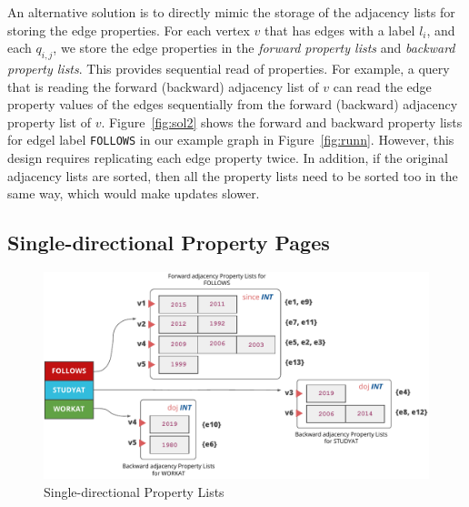  An alternative solution is to directly mimic the storage of the adjacency lists for storing the edge properties. For each vertex $v$ that has edges with a label $l_i$, and each $q_{i,j}$, we store the edge properties in the \emph{forward property lists} and \emph{backward property lists}. This provides sequential read of properties. For example, a query that is reading the forward (backward) adjacency list of $v$ can read the edge property values of the edges sequentially from the forward (backward) adjacency property list of $v$. Figure~\ref{fig:sol2} shows the forward and backward property lists for edgel label \texttt{FOLLOWS} in our example graph in Figure~\ref{fig:runn}. However, this design requires replicating each edge property twice. In addition, if the original adjacency lists are sorted, then all the property lists need to be sorted too in the same way, which would make updates slower. 

\subsection{Single-directional Property Pages}
\label{sec:single-directional-property-pages}

\begin{figure}
	\hfill\includegraphics[scale=0.78]{img/single-dir-prop-list}\hspace*{\fill}
	\captionsetup{justification=centering}
	\caption{Single-directional Property Lists}
	\label{fig:single-dir-prop-list}
\end{figure}

